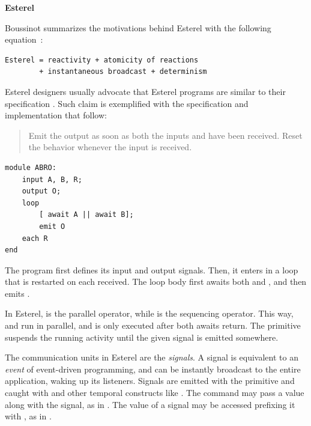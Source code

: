\textbf{Esterel}

Boussinot summarizes the motivations behind Esterel with the following 
equation~\cite{esterel.ieee91}:
\begin{lstlisting}
Esterel = reactivity + atomicity of reactions
        + instantaneous broadcast + determinism
\end{lstlisting}

Esterel designers usually advocate that Esterel programs are similar to their 
specification \cite{esterel.foundations,esterel.ieee91}.
Such claim is exemplified with the specification and implementation that 
follow:

\begin{quote}
Emit the output  as soon as both the inputs  and  have 
been received.
Reset the behavior whenever the input  is received.
\end{quote}


\begin{lstlisting}
module ABRO:
    input A, B, R;
    output O;
    loop
        [ await A || await B];
        emit O
    each R
end
\end{lstlisting}

The program first defines its input and output signals.
Then, it enters in a loop that is restarted on each  received.
The loop body first awaits both  and , and then emits .

In Esterel, \code{||} is the parallel operator, while \code{;} is the 
sequencing operator.
This way,  and  run in parallel, and  
is only executed after both awaits return.
The  primitive suspends the running activity until the given signal 
is emitted somewhere.

The communication units in Esterel are the \emph{signals}.
A signal is equivalent to an \emph{event} of event-driven programming, and can 
be instantly broadcast to the entire application, waking up its listeners.
Signals are emitted with the  primitive and caught with  
and other temporal constructs like .
The  command may pass a value along with the signal, as in 
.
The value of a signal may be accessed prefixing it with , as in 
.


